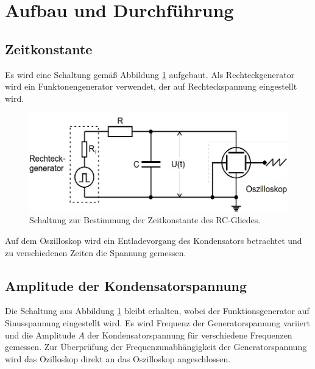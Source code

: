 \section{Aufbau und Durchführung}
\label{sec:Durchführung}
\subsection{Zeitkonstante}
Es wird eine Schaltung gemäß Abbildung \ref{fig:a}
aufgebaut. Als Rechteckgenerator wird ein Funktonengenerator verwendet, der auf Rechteckspannung eingestellt wird.
\begin{figure}
\centering
\includegraphics[width=\linewidth-70pt,height=\textheight-70pt,keepaspectratio]{content/images/a.jpg}
\caption{Schaltung zur Bestimmung der Zeitkonstante des RC-Gliedes.\cite{V353}}
\label{fig:a}
\end{figure}
\newline Auf dem Oszilloskop wird ein Entladevorgang des Kondensators betrachtet und zu verschiedenen Zeiten die Spannung gemessen.
\subsection{Amplitude der Kondensatorspannung}
Die Schaltung aus Abbildung \ref{fig:a} bleibt erhalten, wobei der Funktionsgenerator auf Sinusspannung eingestellt wird.
Es wird Frequenz der Generatorspannung variiert und die Amplitude $A$ der Kondensatorspannung für verschiedene Frequenzen gemessen.
Zur Überprüfung der Frequenzunabhängigkeit der Generatorspannung wird das Ozilloskop direkt an das Oszilloskop angeschlossen.
